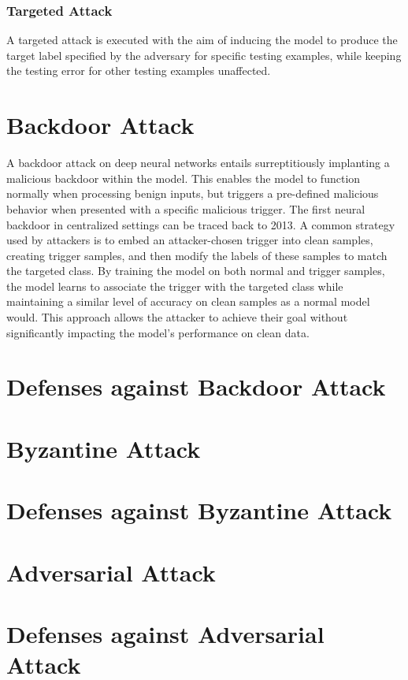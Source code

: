 \documentclass[conference]{IEEEtran}
\begin{document}
\subsubsection{Targeted Attack}A targeted attack is executed with 
the aim of inducing the model to produce the target label specified by the 
adversary for specific testing examples, while keeping the testing error for 
other testing examples unaffected.   

\section{Backdoor Attack}   
A backdoor attack on deep neural networks entails surreptitiously implanting 
a malicious backdoor within the model. This enables the model to function 
normally when processing benign inputs, but triggers a pre-defined 
malicious behavior when presented with a specific malicious trigger.
The first neural backdoor in centralized settings can be traced 
back to 2013\cite{b52}. A common strategy used by attackers is to embed 
an attacker-chosen trigger into clean samples, creating trigger samples, 
and then modify the labels of these samples to match the targeted class. 
By training the model on both normal and trigger samples, the model learns 
to associate the trigger with the targeted class while maintaining a similar 
level of accuracy on clean samples as a normal model would. This approach 
allows the attacker to achieve their goal without significantly impacting 
the model's performance on clean data\cite{b53}. 


\section{Defenses against Backdoor Attack}  
\section{Byzantine Attack}  
\section{Defenses against Byzantine Attack}  
\section{Adversarial Attack}  
\section{Defenses against Adversarial Attack}  
\end{document}
